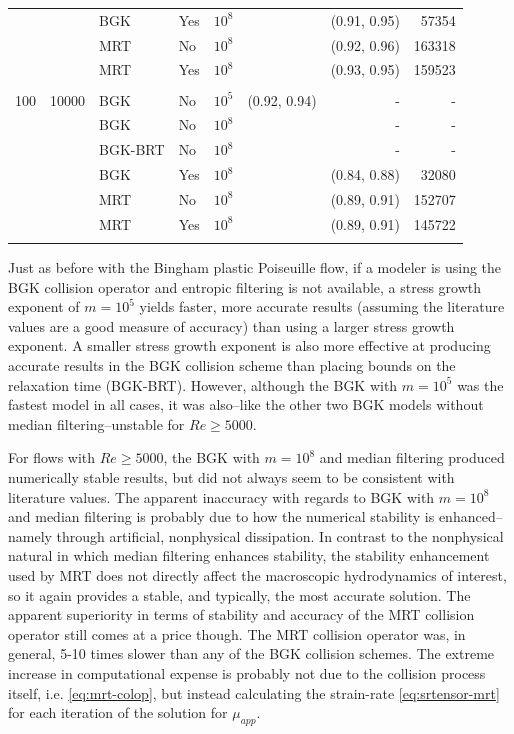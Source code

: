 \documentclass[pdftex,ms]{pittetd}
\begin{document}
\begin{table}
\begin{tabulary}{\linewidth}{r r l l r r r r}
    &      & BGK     & Yes & $10^8$ &              & (0.91, 0.95) & 57354 \\
    &      & MRT     & No  & $10^8$ &              & (0.92, 0.96) & 163318 \\
    &      & MRT     & Yes & $10^8$ &              & (0.93, 0.95) & 159523 \\
\\
100 & 10000 & BGK     & No  & $10^5$ & (0.92, 0.94) & - & - \\
    &       & BGK     & No  & $10^8$ &              & - & - \\
    &       & BGK-BRT & No  & $10^8$ &              & - & - \\
    &       & BGK     & Yes & $10^8$ &              & (0.84, 0.88) & 32080 \\
    &       & MRT     & No  & $10^8$ &              & (0.89, 0.91) & 152707 \\
    &       & MRT     & Yes & $10^8$ &              & (0.89, 0.91) & 145722 \\
\\
\end{tabulary}
\label{tab:lid-bing100}
\end{table}

Just as before with the Bingham plastic Poiseuille flow, if a modeler is using the BGK collision operator and entropic filtering is not available, a stress growth exponent of $m = 10^5$ yields faster, more accurate results (assuming the literature values are a good measure of accuracy) than using a larger stress growth exponent.
A smaller stress growth exponent is also more effective at producing accurate results in the BGK collision scheme than placing bounds on the relaxation time (BGK-BRT).
However, although the BGK with $m = 10^5$ was the fastest model in all cases, it was also--like the other two BGK models without median filtering--unstable for $Re \ge 5000$.

For flows with $Re \ge 5000$, the BGK with $m = 10^8$ and median filtering produced numerically stable results, but did not always seem to be consistent with literature values.
The apparent inaccuracy with regards to BGK with $m = 10^8$ and median filtering is probably due to how the numerical stability is enhanced--namely through artificial, nonphysical dissipation.
In contrast to the nonphysical natural in which median filtering enhances stability, the stability enhancement used by MRT does not directly affect the macroscopic hydrodynamics of interest, so it again provides a stable, and typically, the most accurate solution. %
The apparent superiority in terms of stability and accuracy of the MRT collision operator still comes at a price though.
The MRT collision operator was, in general, 5-10 times slower than any of the BGK collision schemes.
The extreme increase in computational expense is probably not due to the collision process itself, i.e. \eqref{eq:mrt-colop}, but instead calculating the strain-rate \eqref{eq:srtensor-mrt} for each iteration of the solution for $\mu_{app}$.
\end{document}
